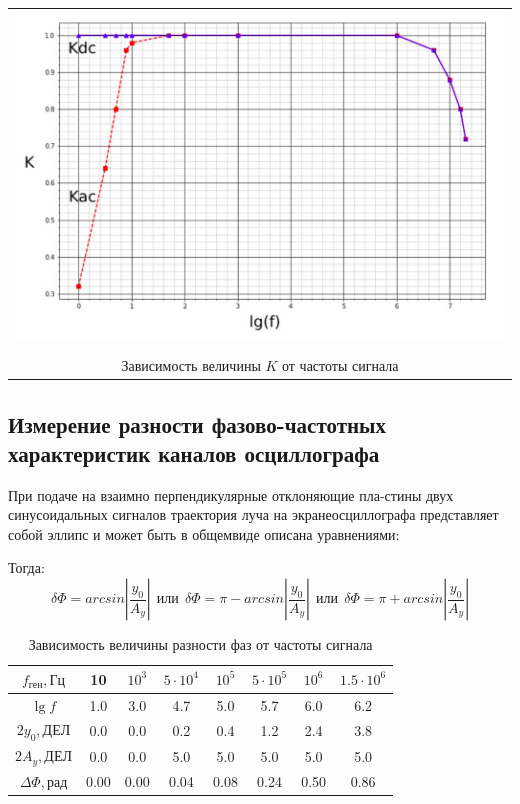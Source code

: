 \documentclass[a4paper,12pt]{article}
\begin{document}
	
		\begin{center}
	\begin{tabular}{c}
		
		\includegraphics[width=1.0\linewidth]{f5.png}\\
		\\	Зависимость величины $K$ от частоты сигнала
		
	\end{tabular}
\end{center}

	

	\subsection*{Измерение разности фазово-частотных характеристик каналов осциллографа}
	

	
	При подаче на взаимно перпендикулярные отклоняющие пла-стины двух синусоидальных сигналов траектория луча на экранеосциллографа представляет собой эллипс и может быть в общемвиде описана уравнениями:
	
	
	Тогда: 
	\begin{equation*}
	\delta\Phi = arcsin|\frac{y_0}{A_y}| \:\: или \:\: \delta\Phi = \pi - arcsin|\frac{y_0}{A_y}| \:\: или \:\: \delta\Phi = \pi + arcsin|\frac{y_0}{A_y}|
	\end{equation*}


\begin{table}[h!]
	\centering
	\begin{tabular}{|c| c| c| c| c |c |c |c|}
		\hline
	$f_{ген}, Гц$&	10 & $10^3$  & $5 \cdot 10^4$  & $10^5$  & $5 \cdot 10^5$ & $10^6$ & $1.5 \cdot 10^6$  \\ 	\hline
	$\lg f$ &	1.0 & 3.0 & 4.7 & 5.0 & 5.7 & 6.0 & 6.2 \\	\hline
	$2y_0, ДЕЛ$	&0.0 & 0.0 & 0.2 & 0.4 & 1.2 & 2.4 & 3.8 \\	\hline
		$2A_y, ДЕЛ$ &0.0 & 0.0 & 5.0 & 5.0 & 5.0 & 5.0 & 5.0 \\	\hline
		$\Delta\Phi, рад$ &0.00 & 0.00 & 0.04 & 0.08 & 0.24 & 0.50 & 0.86 \\ 	\hline
	\end{tabular}
\caption{Зависимость величины разности фаз от частоты сигнала}
\end{table}
\end{document}
